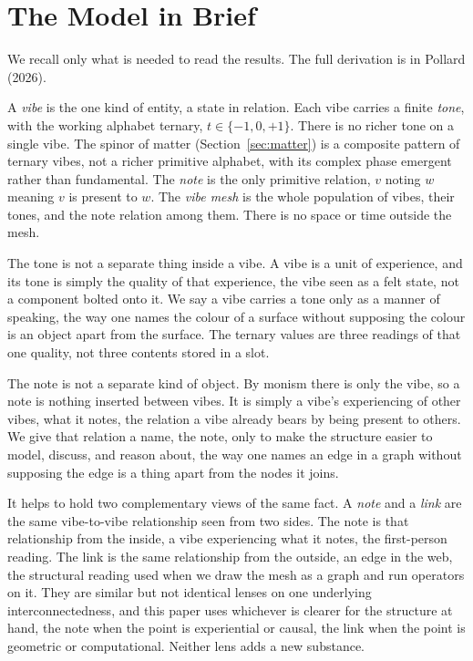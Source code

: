\section{The Model in Brief}
\label{sec:model}

We recall only what is needed to read the results. The full derivation is in Pollard (2026).

\begin{definition}
A \emph{vibe} is the one kind of entity, a state in relation. Each vibe carries a finite \emph{tone}, with the working alphabet ternary, $t \in \{-1, 0, +1\}$. There is no richer tone on a single vibe. The spinor of matter (Section~\ref{sec:matter}) is a composite pattern of ternary vibes, not a richer primitive alphabet, with its complex phase emergent rather than fundamental. The \emph{note} is the only primitive relation, $v$ noting $w$ meaning $v$ is present to $w$. The \emph{vibe mesh} is the whole population of vibes, their tones, and the note relation among them. There is no space or time outside the mesh.
\end{definition}

The tone is not a separate thing inside a vibe. A vibe is a unit of experience, and its tone is simply the quality of that experience, the vibe seen as a felt state, not a component bolted onto it. We say a vibe carries a tone only as a manner of speaking, the way one names the colour of a surface without supposing the colour is an object apart from the surface. The ternary values are three readings of that one quality, not three contents stored in a slot.

The note is not a separate kind of object. By monism there is only the vibe, so a note is nothing inserted between vibes. It is simply a vibe's experiencing of other vibes, what it notes, the relation a vibe already bears by being present to others. We give that relation a name, the note, only to make the structure easier to model, discuss, and reason about, the way one names an edge in a graph without supposing the edge is a thing apart from the nodes it joins.

It helps to hold two complementary views of the same fact. A \emph{note} and a \emph{link} are the same vibe-to-vibe relationship seen from two sides. The note is that relationship from the inside, a vibe experiencing what it notes, the first-person reading. The link is the same relationship from the outside, an edge in the web, the structural reading used when we draw the mesh as a graph and run operators on it. They are similar but not identical lenses on one underlying interconnectedness, and this paper uses whichever is clearer for the structure at hand, the note when the point is experiential or causal, the link when the point is geometric or computational. Neither lens adds a new substance.

